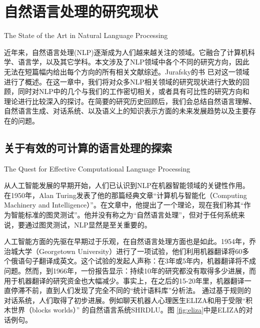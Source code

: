 \chapter{自然语言处理的研究现状}{The State of the Art in Natural Language Processing}
\label{chap:review}

     近年来，自然语言处理(NLP)逐渐成为人们越来越关注的领域。它融合了计算机科学、语言学，以及其它学科。本文涉及了NLP领域中各个不同的研究方向，因此无法在短篇幅内给出每个方向的所有相关文献综述。Jurafsky的书 \cite{Jurafsky2009}已对这一领域进行了概述。在这一章中，我们将对众多NLP相关领域的研究现状进行大致的回顾，同时对NLP中的几个与我们的工作密切相关，或者具有可比性的研究方向和理论进行比较深入的探讨。在简要的研究历史回顾后，我们会总结自然语言理解、自然语言生成、对话系统、以及语义上的知识表示方面的未来发展趋势以及主要存在的问题。

\section{关于有效的可计算的语言处理的探索}{The Quest for Effective Computational Language Processing}

      从人工智能发展的早期开始，人们已认识到NLP在机器智能领域的关键性作用。在1950年，Alan Turing发表了他的那篇经典文章“计算机与智能化（Computing  Machinery and Intelligence）”。在文章中，他提出了一个理论，现在我们称其“作为智能标准的图灵测试”。他并没有称之为“自然语言处理”，但对于任何系统来说，要通过图灵测试，NLP显然是至关重要的。

人工智能方面的先驱在早期过于乐观，在自然语言处理方面也是如此。1954年，乔治城大学（Georgetown University）进行了一项试验，他们利用机器翻译将60多个俄语句子翻译成英文。这个试验的发起人声称：在3年或5年内，机器翻译将不成问题。然而，到1966年，一份报告显示：持续10年的研究都没有取得多少进展，而用于机器翻译的研究资金也大幅减少。事实上，在之后的15-20年里，机器翻译一直停滞不前，直到人们发现了完全不同的“统计语料库”分析法。
通过基于规则的对话系统，人们取得了初步进展。例如聊天机器人心理医生ELIZA\cite{Weizenbaum1966}和用于受限“积木世界（blocks worlds）” 的自然语言系统SHRDLU\cite{Winograd1972}。图 \ref{fig:eliza}中是ELIZA的对话例句。

